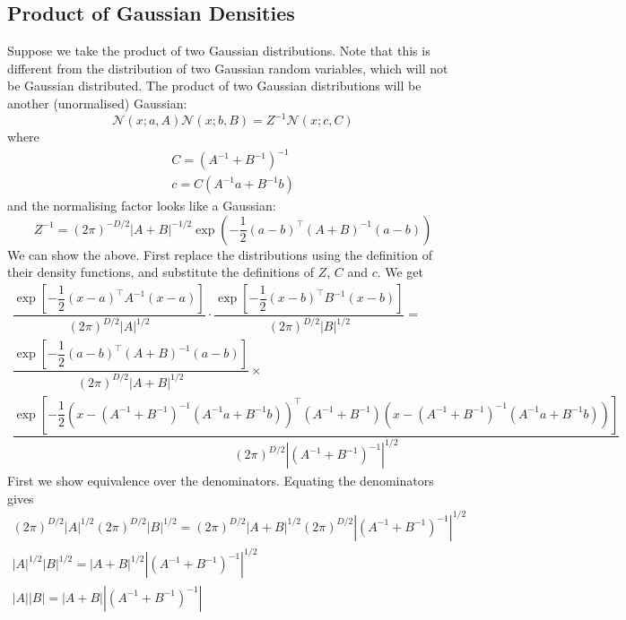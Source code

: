 \documentclass[11pt]{report} %
\begin{document}
\subsection{Product of Gaussian Densities}
Suppose we take the product of two Gaussian distributions. Note that this is different from the distribution of two Gaussian random variables, which will not be Gaussian distributed. The product of two Gaussian distributions will be another (unormalised) Gaussian:
\begin{equation}
\mathcal{N}\left(x; a,A\right)\mathcal{N}\left(x;b,B\right)=Z^{-1}\mathcal{N}\left(x;c,C\right)
\end{equation}
where
\begin{gather}
C=\left(A^{-1}+B^{-1}\right)^{-1} \\
c=C\left(A^{-1}a+B^{-1}b\right)
\end{gather}
and the normalising factor looks like a Gaussian:
\begin{equation}
Z^{-1}=\left(2\pi\right)^{-D/2}\left|A+B\right|^{-1/2}\exp\left(-\dfrac{1}{2}\left(a-b\right)^{\top}\left(A+B\right)^{-1}\left(a-b\right)\right)
\end{equation}
We can show the above. First replace the distributions using the definition of their density functions, and substitute the definitions of $Z$, $C$ and $c$. We get
\begin{multline}
\dfrac{\exp\left[-\dfrac{1}{2}\left(x-a\right)^{\top}A^{-1}\left(x-a\right)\right]}{\left(2\pi\right)^{D/2}\left|A\right|^{1/2}}\cdot\dfrac{\exp\left[-\dfrac{1}{2}\left(x-b\right)^{\top}B^{-1}\left(x-b\right)\right]}{\left(2\pi\right)^{D/2}\left|B\right|^{1/2}} = \\
\dfrac{\exp\left[-\dfrac{1}{2}\left(a-b\right)^{\top}\left(A+B\right)^{-1}\left(a-b\right)\right]}{\left(2\pi\right)^{D/2}\left|A+B\right|^{1/2}}\times \\
\dfrac{\exp\left[-\dfrac{1}{2}\left(x-\left(A^{-1}+B^{-1}\right)^{-1}\left(A^{-1}a+B^{-1}b\right)\right)^{\top}\left(A^{-1}+B^{-1}\right)\left(x-\left(A^{-1}+B^{-1}\right)^{-1}\left(A^{-1}a+B^{-1}b\right)\right)\right]}{\left(2\pi\right)^{D/2}\left|\left(A^{-1}+B^{-1}\right)^{-1}\right|^{1/2}}
\end{multline}
First we show equivalence over the denominators. Equating the denominators gives
\begin{gather}
\left(2\pi\right)^{D/2}\left|A\right|^{1/2}\left(2\pi\right)^{D/2}\left|B\right|^{1/2}=\left(2\pi\right)^{D/2}\left|A+B\right|^{1/2}\left(2\pi\right)^{D/2}\left|\left(A^{-1}+B^{-1}\right)^{-1}\right|^{1/2} \\
\left|A\right|^{1/2}\left|B\right|^{1/2}=\left|A+B\right|^{1/2}\left|\left(A^{-1}+B^{-1}\right)^{-1}\right|^{1/2} \\
\left|A\right|\left|B\right|=\left|A+B\right|\left|\left(A^{-1}+B^{-1}\right)^{-1}\right|
\end{gather}
\end{document}
